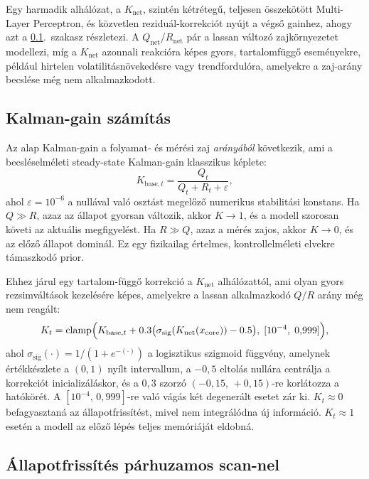 Egy harmadik alhálózat, a $K_\text{net}$, szintén kétrétegű, teljesen összekötött Multi-Layer Perceptron,
és közvetlen reziduál-korrekciót nyújt a végső gainhez, ahogy azt a
\ref{sec:kalman_gain}.\ szakasz részletezi.
A $Q_\text{net}$/$R_\text{net}$ pár a lassan változó zajkörnyezetet modellezi,
míg a $K_\text{net}$ azonnali reakcióra képes gyors, tartalomfüggő eseményekre,
például hirtelen volatilitásnövekedésre vagy trendfordulóra, amelyekre
a zaj-arány becslése még nem alkalmazkodott.

\newpage
\subsection{Kalman-gain számítás}
\label{sec:kalman_gain}

Az alap Kalman-gain a folyamat- és mérési zaj \emph{arányából} következik,
ami a becsléselméleti steady-state Kalman-gain klasszikus képlete:
\begin{equation}
    K_{\text{base},t} = \frac{Q_t}{Q_t + R_t + \varepsilon},
    \label{eq:K_base}
\end{equation}
ahol $\varepsilon = 10^{-6}$ a nullával való osztást megelőző numerikus
stabilitási konstans.
Ha $Q \gg R$, azaz az állapot gyorsan változik, akkor $K \to 1$, és a modell szorosan
követi az aktuális megfigyelést. Ha $R \gg Q$, azaz a mérés zajos, akkor $K \to 0$,
és az előző állapot dominál.
Ez egy fizikailag értelmes, kontrollelméleti elvekre támaszkodó prior.

Ehhez járul egy tartalom-függő korrekció a $K_\text{net}$ alhálózattól,
ami olyan gyors rezsimváltások kezelésére képes, amelyekre a lassan
alkalmazkodó $Q/R$ arány még nem reagált:
\begin{equation}
    K_t = \mathrm{clamp}\Bigl(K_{\text{base},t} +
          0.3\bigl(\sigma_\text{sig}(K_\text{net}(x_\text{core})) - 0.5\bigr),\;
          [10^{-4},\; 0{,}999]\Bigr),
    \label{eq:K_final}
\end{equation}
ahol $\sigma_\text{sig}(\cdot) = 1/(1+e^{-(\cdot)})$ a logisztikus szigmoid
függvény, amelynek értékkészlete a $(0,1)$ nyílt intervallum, a $-0{,}5$ eltolás nullára centrálja
a korrekciót inicializáláskor, és a $0{,}3$ szorzó $(-0{,}15,\, +0{,}15)$-re
korlátozza a hatókörét.
A $[10^{-4},\, 0{,}999]$-re való vágás két degenerált esetet zár ki.
$K_t \approx 0$ befagyasztaná az állapotfrissítést, mivel nem integrálódna
új információ. $K_t \approx 1$ esetén a modell az előző lépés teljes memóriáját eldobná.

\subsection{Állapotfrissítés párhuzamos scan-nel}

